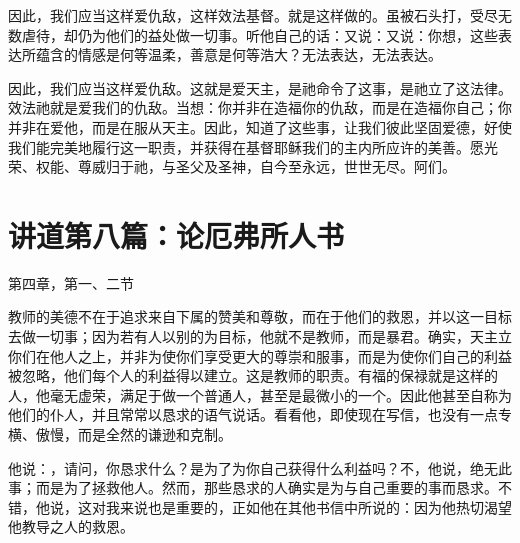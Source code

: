 因此，我们应当这样爱仇敌，这样效法基督。就是这样做的。虽被石头打，受尽无数虐待，却仍为他们的益处做一切事。听他自己的话：又说：又说：你想，这些表达所蕴含的情感是何等温柔，善意是何等浩大？无法表达，无法表达。\par

因此，我们应当这样爱仇敌。这就是爱天主，是祂命令了这事，是祂立了这法律。效法祂就是爱我们的仇敌。当想：你并非在造福你的仇敌，而是在造福你自己；你并非在爱他，而是在服从天主。因此，知道了这些事，让我们彼此坚固爱德，好使我们能完美地履行这一职责，并获得在基督耶稣我们的主内所应许的美善。愿光荣、权能、尊威归于祂，与圣父及圣神，自今至永远，世世无尽。阿们。\par



\section{讲道第八篇：论厄弗所人书}

第四章，第一、二节\par

\par

教师的美德不在于追求来自下属的赞美和尊敬，而在于他们的救恩，并以这一目标去做一切事；因为若有人以别的为目标，他就不是教师，而是暴君。确实，天主立你们在他人之上，并非为使你们享受更大的尊崇和服事，而是为使你们自己的利益被忽略，他们每个人的利益得以建立。这是教师的职责。有福的保禄就是这样的人，他毫无虚荣，满足于做一个普通人，甚至是最微小的一个。因此他甚至自称为他们的仆人，并且常常以恳求的语气说话。看看他，即使现在写信，也没有一点专横、傲慢，而是全然的谦逊和克制。\par

他说：，请问，你恳求什么？是为了为你自己获得什么利益吗？不，他说，绝无此事；而是为了拯救他人。然而，那些恳求的人确实是为与自己重要的事而恳求。不错，他说，这对我来说也是重要的，正如他在其他书信中所说的：因为他热切渴望他教导之人的救恩。\par

